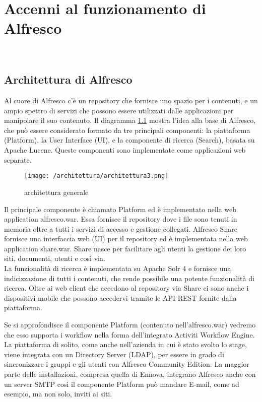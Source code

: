 \chapter{Accenni al funzionamento di Alfresco}
\label{cap:architettura}

\\

\section{Architettura di Alfresco}
Al cuore di Alfresco c'è un repository che fornisce uno spazio per i contenuti, e un ampio spettro di servizi che possono essere utilizzati dalle applicazioni per manipolare il suo contenuto. Il diagramma \ref{fig:architettura-generale} mostra l'idea alla base di Alfresco, che può essere considerato formato da tre principali componenti: la piattaforma (Platform), la User Interface (UI), e la componente di ricerca (Search), basata su Apache Lucene. Queste componenti sono implementate come applicazioni web separate.
\begin{figure}[!ht]
\centering
\texttt{[image: /architettura/architettura3.png]}
\caption{architettura generale}
\label{fig:architettura-generale}
\end{figure}
Il principale componente è chiamato Platform ed è implementato nella web application alfresco.war. Essa fornisce il repository dove i file sono tenuti in memoria oltre a tutti i servizi di accesso e gestione collegati. Alfresco Share fornisce una interfaccia web (UI) per il repository ed è implementata nella web application share.war. Share nasce per facilitare agli utenti la gestione dei loro siti, documenti, utenti e così via.\\
La funzionalità di ricerca è implementata su Apache Solr 4 e fornisce una indicizzazione di tutti i contenuti, che rende possibile una potente funzionalità di ricerca. Oltre ai web client che accedono al repository via Share ci sono anche i dispositivi mobile che possono accedervi tramite le \gls{API} REST fornite dalla piattaforma.

Se si approfondisce il componente Platform (contenuto nell'alfresco.war) vedremo che esso supporta i workflow nella forma dell'integrato \gls{Activiti Workflow Engine}. La piattaforma di solito, come anche nell'azienda in cui è stato svolto lo stage, viene integrata con un Directory Server (LDAP), per essere in grado di sincronizzare i gruppi e gli utenti con Alfresco Community Edition. La maggior parte delle installazioni, compresa quella di Ennova, integrano Alfresco anche con un server SMTP così il componente Platform può mandare E-mail, come ad esempio, ma non solo, inviti ai siti.

